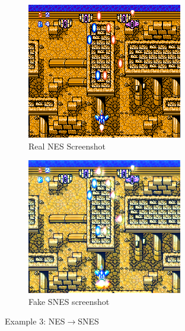 \documentclass[10pt,twocolumn,letterpaper]{article}
\begin{document}
\begin{figure}[htp]
   \centering
   \begin{subfigure}[b]{0.235\textwidth}
      \includegraphics[width=\textwidth]{figures/nes_to_snes/Crisis_Force_(J)__ucc__12_real_A.png}
      \caption{Real NES Screenshot}
      \label{fig:ss3a}
   \end{subfigure}
   \begin{subfigure}[b]{0.235\textwidth}
      \includegraphics[width=\textwidth]{figures/nes_to_snes/Crisis_Force_(J)__ucc__12_fake_B.png}
      \caption{Fake SNES screenshot}
      \label{fig:ss3b}
   \end{subfigure}
   \caption{Example 3: NES$\rightarrow$SNES}
\end{figure}
\end{document}
